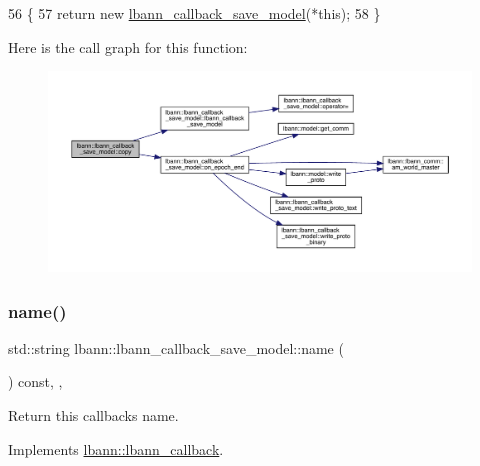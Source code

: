 \begin{DoxyCode}
56                                                    \{
57     \textcolor{keywordflow}{return} \textcolor{keyword}{new} \hyperlink{classlbann_1_1lbann__callback__save__model_a603d5e3c418ddc29724664eeff401707}{lbann\_callback\_save\_model}(*\textcolor{keyword}{this});
58   \}
\end{DoxyCode}
Here is the call graph for this function\+:\nopagebreak
\begin{figure}[H]
\begin{center}
\leavevmode
\includegraphics[width=350pt]{classlbann_1_1lbann__callback__save__model_adaebfea30dcc1c32a8ae25a3307abb7f_cgraph}
\end{center}
\end{figure}
\mbox{\label{classlbann_1_1lbann__callback__save__model_a85b88992e7cd7073279b8a9b6d8b142f}} 
\subsubsection{\texorpdfstring{name()}{name()}}
{\footnotesize\ttfamily std\+::string lbann\+::lbann\+\_\+callback\+\_\+save\+\_\+model\+::name (\begin{DoxyParamCaption}{ }\end{DoxyParamCaption}) const\hspace{0.3cm}{\ttfamily [inline]}, {\ttfamily [override]}, {\ttfamily [virtual]}}

Return this callback\textquotesingle{}s name. 

Implements \hyperlink{classlbann_1_1lbann__callback_a7522c7a14f1d6a1ea762cc2d7248eb3a}{lbann\+::lbann\+\_\+callback}.



